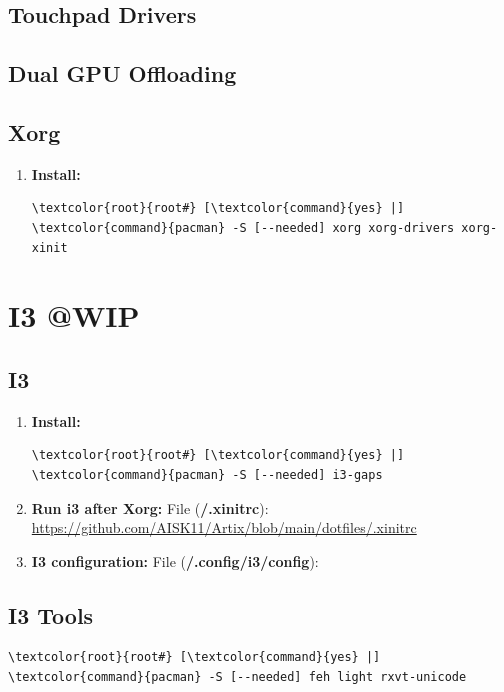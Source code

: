 \documentclass[10pt, a4paper, onecolumn, oneside, titlepage, openany]{book}
\begin{document}
\section{Touchpad Drivers}

\section{Dual GPU Offloading}

\section{Xorg}
\begin{enumerate}
    \item \textbf{Install:}
\begin{Verbatim}[commandchars=\\\{\}]
\textcolor{root}{root#} [\textcolor{command}{yes} |] \textcolor{command}{pacman} -S [--needed] xorg xorg-drivers xorg-xinit
\end{Verbatim}
\end{enumerate}


\chapter{I3 @WIP}
\section{I3}
\begin{enumerate}
    \item \textbf{Install:}
\begin{Verbatim}[commandchars=\\\{\}]
\textcolor{root}{root#} [\textcolor{command}{yes} |] \textcolor{command}{pacman} -S [--needed] i3-gaps
\end{Verbatim}
    \item \textbf{Run i3 after Xorg:}
\newline File (\textbf{\textcolor{file}{\texttildelow/.xinitrc}}):
\newline \url{https://github.com/AISK11/Artix/blob/main/dotfiles/.xinitrc}
    \item \textbf{I3 configuration:}
\newline File (\textbf{\textcolor{file}{\texttildelow/.config/i3/config}}):
\newline \url{}    
\end{enumerate}
\section{I3 Tools}
\begin{Verbatim}[commandchars=\\\{\}]
\textcolor{root}{root#} [\textcolor{command}{yes} |] \textcolor{command}{pacman} -S [--needed] feh light rxvt-unicode
\end{Verbatim}
\end{document}
